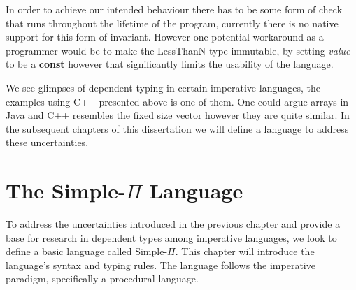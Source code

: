 \documentclass[a4paper,12pt]{report}
\begin{document}
\par
In order to achieve our intended behaviour there has to be some form of check 
that runs throughout the lifetime of the program, currently there is no native 
support for this form of invariant. However one potential workaround as a 
programmer would be to make the LessThanN type immutable, by setting \textit{value} 
to be a \textbf{const} however that significantly limits the usability of the 
language. 

\par
We see glimpses of dependent typing in certain imperative languages, the 
examples using C++ presented above is one of them. One could argue arrays in 
Java and C++ resembles the fixed size vector however they are quite similar. In 
the subsequent chapters of this dissertation we will define a language to 
address these uncertainties. 

\chapter{The Simple-$\Pi$ Language}
To address the uncertainties introduced in the previous chapter and provide a 
base for research in dependent types among imperative languages, we look to 
define a basic language called Simple-$\Pi$. This chapter will introduce 
the language's syntax and typing rules. The language follows 
the imperative paradigm, specifically a procedural language.
\end{document}
